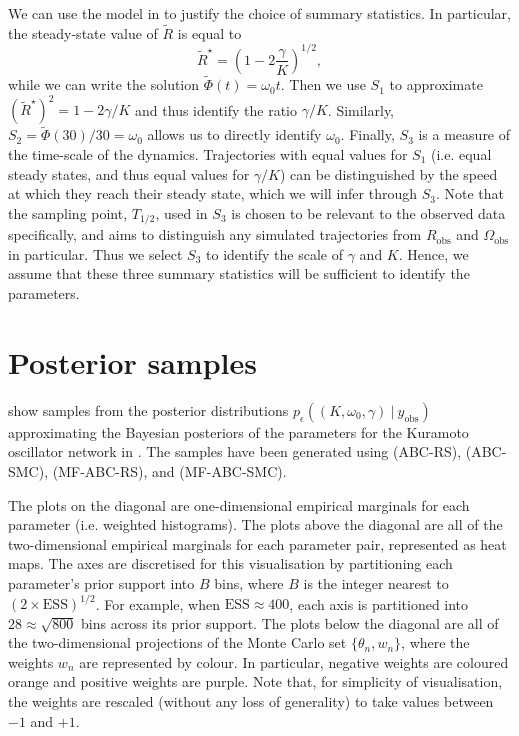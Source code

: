 \documentclass[12pt, onecolumn]{article}
\newcommand{\obs}[1]{#1_{\mathrm{obs}}}
\begin{document}
We can use the model in  to justify the choice of summary statistics.
In particular, the steady-state value of $\tilde R$ is equal to
\[
\tilde R^\star = \left( 1 - 2\frac{\gamma}{K} \right)^{1/2},
\]
while we can write the solution $\tilde \Phi(t) = \omega_0 t$.
Then we use $S_1$ to approximate $(\tilde R^\star)^2 = 1 - 2\gamma/K$ and thus identify the ratio $\gamma/K$.
Similarly, $S_2 = \tilde \Phi(30)/30 = \omega_0$ allows us to directly identify $\omega_0$.
Finally, $S_3$ is a measure of the time-scale of the dynamics.
Trajectories with equal values for $S_1$ (i.e. equal steady states, and thus equal values for $\gamma/K$) can be distinguished by the speed at which they reach their steady state, which we will infer through $S_3$.
Note that the sampling point, $T_{1/2}$, used in $S_3$ is chosen to be relevant to the observed data specifically, and aims to distinguish any simulated trajectories from $\obs R$ and $\obs \Omega$ in particular.
Thus we select $S_3$ to identify the scale of $\gamma$ and $K$.
Hence, we assume that these three summary statistics will be sufficient to identify the parameters.


\section{Posterior samples}
show samples from the posterior distributions $p_\epsilon((K, \omega_0, \gamma)~|~\obs y)$ approximating the Bayesian posteriors of the parameters for the Kuramoto oscillator network in .
The samples have been generated using  (ABC-RS),  (ABC-SMC),  (MF-ABC-RS), and  (MF-ABC-SMC).

The plots on the diagonal are one-dimensional empirical marginals for each parameter (i.e. weighted histograms).
The plots above the diagonal are all of the two-dimensional empirical marginals for each parameter pair, represented as heat maps.
The axes are discretised for this visualisation by partitioning each parameter's prior support into $B$ bins, where $B$ is the integer nearest to $(2 \times \mathrm{ESS})^{1/2}$.
For example, when $\mathrm{ESS} \approx 400$, each axis is partitioned into $28 \approx \sqrt{800}$ bins across its prior support.
The plots below the diagonal are all of the two-dimensional projections of the Monte Carlo set $\{ \theta_n, w_n \}$, where the weights $w_n$ are represented by colour.
In particular, negative weights are coloured orange and positive weights are purple.
Note that, for simplicity of visualisation, the weights are rescaled (without any loss of generality) to take values between $-1$ and $+1$.
\end{document}
